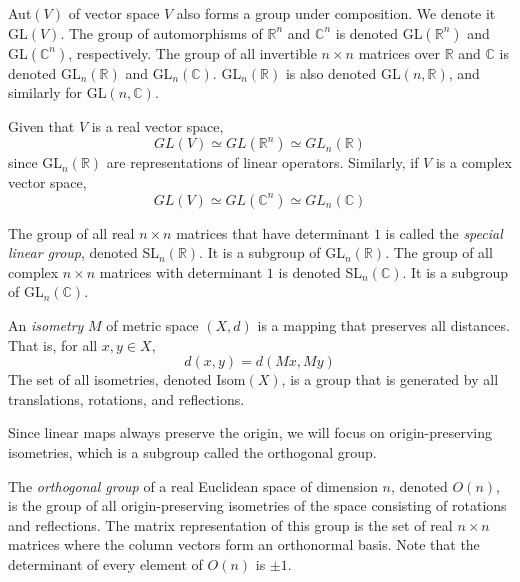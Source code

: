 \documentclass{article}
\begin{document}
    \begin{definition}
    Aut$(V)$ of vector space $V$ also forms a group under composition. We denote it GL$(V)$. The group of automorphisms of $\mathbb{R}^n$ and $\mathbb{C}^n$ is denoted GL$(\mathbb{R}^n)$ and GL$(\mathbb{C}^n)$, respectively. The group of all invertible $n \times n$ matrices over $\mathbb{R}$ and $\mathbb{C}$ is denoted GL$_n(\mathbb{R})$ and GL$_n(\mathbb{C})$. GL$_n(\mathbb{R})$ is also denoted GL$(n, \mathbb{R})$, and similarly for GL$(n, \mathbb{C})$. 
    \end{definition}

    \begin{proposition}
    Given that $V$ is a real vector space, 
    \[GL(V) \simeq GL(\mathbb{R}^n) \simeq GL_n (\mathbb{R})\]
    since GL$_n(\mathbb{R})$ are representations of linear operators. Similarly, if $V$ is a complex vector space, 
    \[GL(V) \simeq GL(\mathbb{C}^n) \simeq GL_n (\mathbb{C})\]
    \end{proposition}

    \begin{definition}
    The group of all real $n \times n$ matrices that have determinant $1$ is called the \textit{special linear group}, denoted SL$_n (\mathbb{R})$. It is a subgroup of GL$_n (\mathbb{R})$. The group of all complex $n \times n$ matrices with determinant $1$ is denoted SL$_n (\mathbb{C})$. It is a subgroup of GL$_n(\mathbb{C})$. 
    \end{definition}

    \begin{definition}
    An \textit{isometry} $M$ of metric space $(X, d)$ is a mapping that preserves all distances. That is, for all $x, y \in X$, 
    \[d(x, y) = d(M x, M y) \]
    The set of all isometries, denoted Isom$(X)$, is a group that is generated by all translations, rotations, and reflections. 
    \end{definition}

    Since linear maps always preserve the origin, we will focus on origin-preserving isometries, which is a subgroup called the orthogonal group.

    \begin{definition}
    The \textit{orthogonal group} of a real Euclidean space of dimension $n$, denoted $O(n)$, is the group of all origin-preserving isometries of the space consisting of rotations and reflections. The matrix representation of this group is the set of real $n \times n$ matrices where the column vectors form an orthonormal basis. Note that the determinant of every element of $O(n)$ is $\pm 1$. 
    \end{definition}
\end{document}
